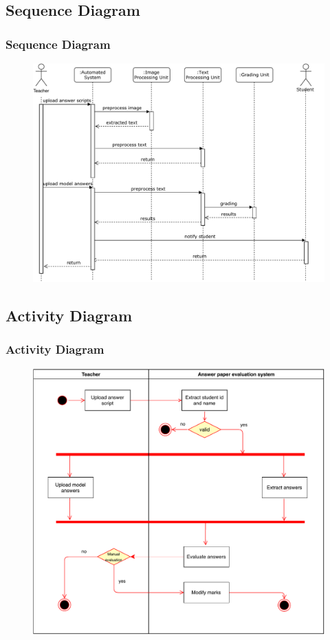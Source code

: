 \subsection{Sequence Diagram}
\begin{frame}
    \frametitle{Sequence Diagram}
    \begin{figure}[!h]
        \centering
        \includegraphics[scale=0.45]{images/sequence-diagram.pdf}
    \end{figure}
\end{frame}

\subsection{Activity Diagram}
\begin{frame}
    \frametitle{Activity Diagram}
    \begin{figure}[!h]
        \centering
        \includegraphics[scale=0.45]{images/activity-diagram.pdf}
    \end{figure}
\end{frame}